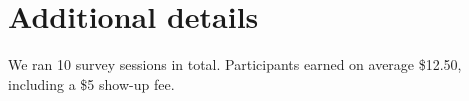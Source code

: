 \section{Additional details}
\label{app:details}
We ran 10 survey sessions in total. Participants earned on average \$12.50, including a \$5 show-up fee.

